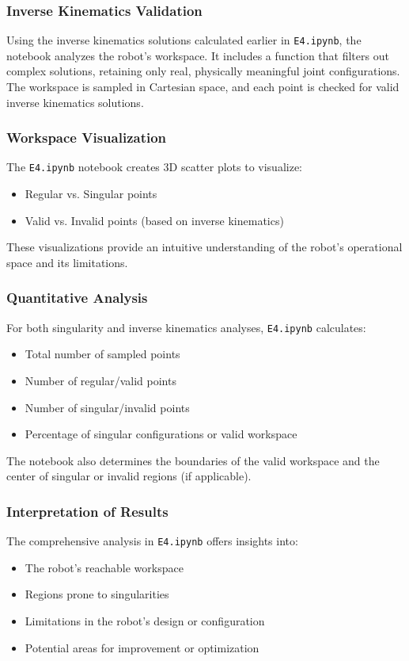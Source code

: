 \begin{solution}
\subsubsection*{Inverse Kinematics Validation}

Using the inverse kinematics solutions calculated earlier in \texttt{E4.ipynb}, the notebook analyzes the robot's workspace. It includes a function that filters out complex solutions, retaining only real, physically meaningful joint configurations. The workspace is sampled in Cartesian space, and each point is checked for valid inverse kinematics solutions.

\subsubsection*{Workspace Visualization}
The \texttt{E4.ipynb} notebook creates 3D scatter plots to visualize:
\begin{itemize}
    \item Regular vs. Singular points
    \item Valid vs. Invalid points (based on inverse kinematics)
\end{itemize}
These visualizations provide an intuitive understanding of the robot's operational space and its limitations.

\subsubsection*{Quantitative Analysis}
For both singularity and inverse kinematics analyses, \texttt{E4.ipynb} calculates:
\begin{itemize}
    \item Total number of sampled points
    \item Number of regular/valid points
    \item Number of singular/invalid points
    \item Percentage of singular configurations or valid workspace
\end{itemize}
The notebook also determines the boundaries of the valid workspace and the center of singular or invalid regions (if applicable).

\subsubsection*{Interpretation of Results}
The comprehensive analysis in \texttt{E4.ipynb} offers insights into:
\begin{itemize}
    \item The robot's reachable workspace
    \item Regions prone to singularities
    \item Limitations in the robot's design or configuration
    \item Potential areas for improvement or optimization
\end{itemize}


\end{solution}
